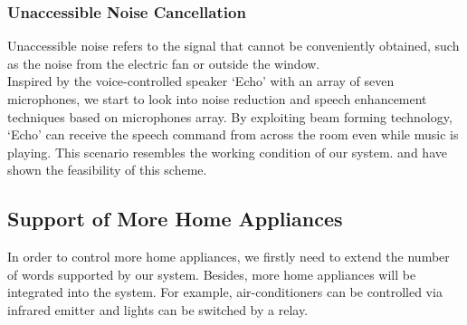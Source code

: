 
\subsubsection{Unaccessible Noise Cancellation}

Unaccessible noise refers to the signal that cannot be conveniently obtained, such as the noise from the electric fan or outside the window.\\

Inspired by the voice-controlled speaker `Echo' with an array of seven microphones, we start to look into noise reduction and speech enhancement techniques based on microphones array. By exploiting beam forming technology, `Echo' can receive the speech command from across the room even while music is playing. This scenario resembles the working condition of our system. \cite{mccowan2003microphone} and \cite{spalt2011background} have shown the feasibility of this scheme.


\subsection{Support of More Home Appliances}
In order to control more home appliances, we firstly need to extend the number of words supported by our system. Besides, more home appliances will be integrated into the system. For example, air-conditioners can be controlled via infrared emitter and lights can be switched by a relay.
